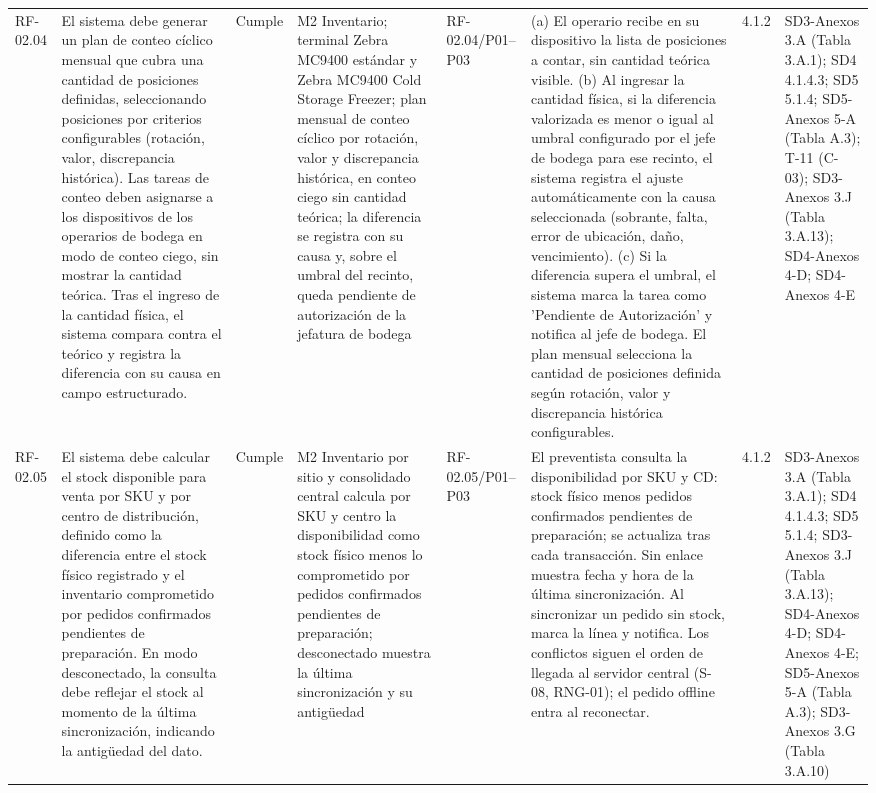 \documentclass[oficio,firma,final]{lafrox}
\begin{document}
\begin{landscape}
{\begin{longtable}{@{}F{0.054} F{0.173} F{0.061} F{0.191} F{0.106} F{0.180} F{0.067} F{0.168}@{}}
  RF-02.04 & El sistema debe generar un plan de conteo cíclico mensual que cubra una cantidad de posiciones definidas, seleccionando posiciones por criterios configurables (rotación, valor, discrepancia histórica). Las tareas de conteo deben asignarse a los dispositivos de los operarios de bodega en modo de conteo ciego, sin mostrar la cantidad teórica. Tras el ingreso de la cantidad física, el sistema compara contra el teórico y registra la diferencia con su causa en campo estructurado. & Cumple & M2 Inventario; terminal Zebra MC9400 estándar y Zebra MC9400 Cold Storage Freezer; plan mensual de conteo cíclico por rotación, valor y discrepancia histórica, en conteo ciego sin cantidad teórica; la diferencia se registra con su causa y, sobre el umbral del recinto, queda pendiente de autorización de la jefatura de bodega & RF-02.04/\allowbreak{}P01--\allowbreak{}P03 & (a) El operario recibe en su dispositivo la lista de posiciones a contar, sin cantidad teórica visible. (b) Al ingresar la cantidad física, si la diferencia valorizada es menor o igual al umbral configurado por el jefe de bodega para ese recinto, el sistema registra el ajuste automáticamente con la causa seleccionada (sobrante, falta, error de ubicación, daño, vencimiento). (c) Si la diferencia supera el umbral, el sistema marca la tarea como 'Pendiente de Autorización' y notifica al jefe de bodega. El plan mensual selecciona la cantidad de posiciones definida según rotación, valor y discrepancia histórica configurables. & 4.1.2 & SD3-Anexos 3.A (Tabla 3.A.1); SD4 4.1.4.3; SD5 5.1.4; SD5-Anexos 5-A (Tabla A.3); T-11 (C-03); SD3-Anexos 3.J (Tabla 3.A.13); SD4-Anexos 4-D; SD4-Anexos 4-E  \\
  RF-02.05 & El sistema debe calcular el stock disponible para venta por SKU y por centro de distribución, definido como la diferencia entre el stock físico registrado y el inventario comprometido por pedidos confirmados pendientes de preparación. En modo desconectado, la consulta debe reflejar el stock al momento de la última sincronización, indicando la antigüedad del dato. & Cumple & M2 Inventario por sitio y consolidado central calcula por SKU y centro la disponibilidad como stock físico menos lo comprometido por pedidos confirmados pendientes de preparación; desconectado muestra la última sincronización y su antigüedad & RF-02.05/\allowbreak{}P01--\allowbreak{}P03 & El preventista consulta la disponibilidad por SKU y CD: stock físico menos pedidos confirmados pendientes de preparación; se actualiza tras cada transacción. Sin enlace muestra fecha y hora de la última sincronización. Al sincronizar un pedido sin stock, marca la línea y notifica. Los conflictos siguen el orden de llegada al servidor central (S-08, RNG-01); el pedido offline entra al reconectar. & 4.1.2 & SD3-Anexos 3.A (Tabla 3.A.1); SD4 4.1.4.3; SD5 5.1.4; SD3-Anexos 3.J (Tabla 3.A.13); SD4-Anexos 4-D; SD4-Anexos 4-E; SD5-Anexos 5-A (Tabla A.3); SD3-Anexos 3.G (Tabla 3.A.10)  \\

\end{longtable}}
\end{landscape}
\end{document}
